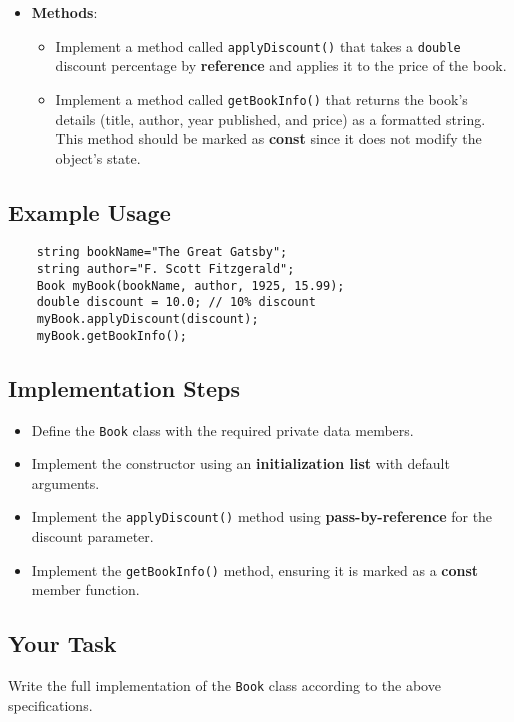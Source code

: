 \documentclass[a4paper]{article}
\begin{document}
\begin{itemize}
    \item \textbf{Methods}:
    \begin{itemize}
        \item Implement a method called \texttt{applyDiscount()} that takes a \texttt{double} discount percentage by \textbf{reference} and applies it to the price of the book.
        \item Implement a method called \texttt{getBookInfo()} that returns the book's details (title, author, year published, and price) as a formatted string. This method should be marked as \textbf{const} since it does not modify the object's state.
    \end{itemize}
\end{itemize}

\subsection*{Example Usage}

\begin{verbatim}
    string bookName="The Great Gatsby";
    string author="F. Scott Fitzgerald";
    Book myBook(bookName, author, 1925, 15.99);
    double discount = 10.0; // 10% discount
    myBook.applyDiscount(discount);
    myBook.getBookInfo();
\end{verbatim}

\subsection*{Implementation Steps}

\begin{itemize}
    \item Define the \texttt{Book} class with the required private data members.
    \item Implement the constructor using an \textbf{initialization list} with default arguments.
    \item Implement the \texttt{applyDiscount()} method using \textbf{pass-by-reference} for the discount parameter.
    \item Implement the \texttt{getBookInfo()} method, ensuring it is marked as a \textbf{const} member function.
\end{itemize}

\subsection*{Your Task}
Write the full implementation of the \texttt{Book} class according to the above specifications.
\newpage
\end{document}
